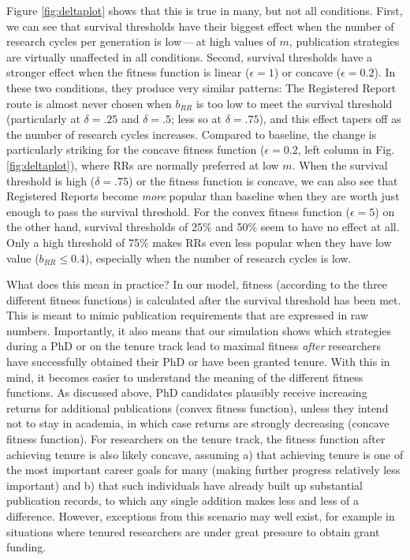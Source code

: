 \documentclass[
  ,man,mask,floatsintext]{apa6}
\begin{document}
Figure \ref{fig:deltaplot} shows that this is true in many, but not all conditions.
First, we can see that survival thresholds have their biggest effect when the number of research cycles per generation is low\(\,\)---\(\,\)at high values of \(m\), publication strategies are virtually unaffected in all conditions.
Second, survival thresholds have a stronger effect when the fitness function is linear (\(\epsilon = 1\)) or concave (\(\epsilon = 0.2\)).
In these two conditions, they produce very similar patterns:
The Registered Report route is almost never chosen when \(b_{RR}\) is too low to meet the survival threshold (particularly at \(\delta = .25\) and \(\delta = .5\); less so at \(\delta = .75\)), and this effect tapers off as the number of research cycles increases.
Compared to baseline, the change is particularly striking for the concave fitness function (\(\epsilon = 0.2\), left column in Fig. \ref{fig:deltaplot}), where RRs are normally preferred at low \(m\).
When the survival threshold is high (\(\delta = .75\)) or the fitness function is concave, we can also see that Registered Reports become \emph{more} popular than baseline when they are worth just enough to pass the survival threshold.
For the convex fitness function (\(\epsilon = 5\)) on the other hand, survival thresholds of 25\% and 50\% seem to have no effect at all.
Only a high threshold of 75\% makes RRs even less popular when they have low value (\(b_{RR}\leq 0.4\)), especially when the number of research cycles is low.

What does this mean in practice?
In our model, fitness (according to the three different fitness functions) is calculated after the survival threshold has been met.
This is meant to mimic publication requirements that are expressed in raw numbers.
Importantly, it also means that our simulation shows which strategies during a PhD or on the tenure track lead to maximal fitness \emph{after} researchers have successfully obtained their PhD or have been granted tenure.
With this in mind, it becomes easier to understand the meaning of the different fitness functions.
As discussed above, PhD candidates plausibly receive increasing returns for additional publications (convex fitness function), unless they intend not to stay in academia, in which case returns are strongly decreasing (concave fitness function).
For researchers on the tenure track, the fitness function after achieving tenure is also likely concave, assuming a) that achieving tenure is one of the most important career goals for many (making further progress relatively less important) and b) that such individuals have already built up substantial publication records, to which any single addition makes less and less of a difference.
However, exceptions from this scenario may well exist, for example in situations where tenured researchers are under great pressure to obtain grant funding.
\end{document}
